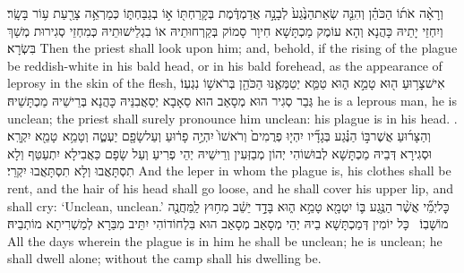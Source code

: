 {וְרָאָ֨ה אֹת֜וֹ הַכֹּהֵ֗ן וְהִנֵּ֤ה שְׂאֵת\maqqaf הַנֶּ֙גַע֙ לְבָנָ֣ה אֲדַמְדֶּ֔מֶת בְּקָרַחְתּ֖וֹ א֣וֹ בְגַבַּחְתּ֑וֹ כְּמַרְאֵ֥ה צָרַ֖עַת ע֥וֹר בָּשָֽׂר׃}
{וְיִחְזֵי יָתֵיהּ כָּהֲנָא וְהָא עוֹמֶק מַכְתָּשָׁא חִיוָר סָמוֹק בְּקַרְחוּתֵיהּ אוֹ בִגְלֵישׁוּתֵיהּ כְּמִחְזֵי סְגִירוּת מְשַׁךְ בִּשְׂרָא׃}
{Then the priest shall look upon him; and, behold, if the rising of the plague be reddish-white in his bald head, or in his bald forehead, as the appearance of leprosy in the skin of the flesh,}{}
{אִישׁ\maqqaf צָר֥וּעַ ה֖וּא טָמֵ֣א ה֑וּא טַמֵּ֧א יְטַמְּאֶ֛נּוּ הַכֹּהֵ֖ן בְּרֹאשׁ֥וֹ נִגְעֽוֹ׃}
{גְּבַר סְגִיר הוּא מְסָאַב הוּא סַאָבָא יְסַאֲבִנֵּיהּ כָּהֲנָא בְּרֵישֵׁיהּ מַכְתָּשֵׁיהּ׃}
{he is a leprous man, he is unclean; the priest shall surely pronounce him unclean: his plague is in his head. .}{}
{וְהַצָּר֜וּעַ אֲשֶׁר\maqqaf בּ֣וֹ הַנֶּ֗גַע בְּגָדָ֞יו יִהְי֤וּ פְרֻמִים֙ וְרֹאשׁוֹ֙ יִהְיֶ֣ה פָר֔וּעַ וְעַל\maqqaf שָׂפָ֖ם יַעְטֶ֑ה וְטָמֵ֥א \pasek  טָמֵ֖א יִקְרָֽא׃}
{וּסְגִירָא דְּבֵיהּ מַכְתָּשָׁא לְבוּשׁוֹהִי יְהוֹן מְבַזְּעִין וְרֵישֵׁיהּ יְהֵי פְרִיעַ וְעַל שָׂפָם כַּאֲבִילָא יִתְעַטַּף וְלָא תִסְתָּאֲבוּ וְלָא תִסְתָּאֲבוּ יִקְרֵי׃}
{And the leper in whom the plague is, his clothes shall be rent, and the hair of his head shall go loose, and he shall cover his upper lip, and shall cry: ‘Unclean, unclean.’}{}
{כׇּל\maqqaf יְמֵ֞י אֲשֶׁ֨ר הַנֶּ֥גַע בּ֛וֹ יִטְמָ֖א טָמֵ֣א ה֑וּא בָּדָ֣ד יֵשֵׁ֔ב מִח֥וּץ לַֽמַּחֲנֶ֖ה מוֹשָׁבֽוֹ׃ \setuma }
{כָּל יוֹמִין דְּמַכְתָּשָׁא בֵיהּ יְהֵי מְסָאַב מְסָאַב הוּא בִּלְחוֹדוֹהִי יִתֵּיב מִבַּרָא לְמַשְׁרִיתָא מוֹתְבֵיהּ׃}
{All the days wherein the plague is in him he shall be unclean; he is unclean; he shall dwell alone; without the camp shall his dwelling be.}{}
